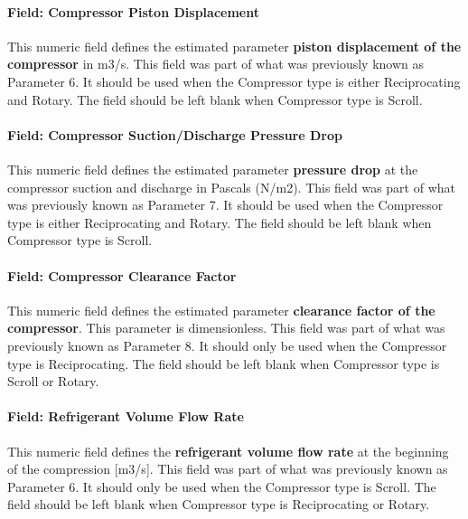 \paragraph{Field: Compressor Piston Displacement}\label{field-compressor-piston-displacement}

This numeric field defines the estimated parameter \textbf{piston displacement of the compressor} in m3/s. This field was part of what was previously known as Parameter 6. It should be used when the Compressor type is either Reciprocating and Rotary. The field should be left blank when Compressor type is Scroll.

\paragraph{Field: Compressor Suction/Discharge Pressure Drop}\label{field-compressor-suctiondischarge-pressure-drop}

This numeric field defines the estimated parameter \textbf{pressure drop} at the compressor suction and discharge in Pascals (N/m2). This field was part of what was previously known as Parameter 7. It should be used when the Compressor type is either Reciprocating and Rotary. The field should be left blank when Compressor type is Scroll.

\paragraph{Field: Compressor Clearance Factor}\label{field-compressor-clearance-factor}

This numeric field defines the estimated parameter \textbf{clearance factor of the compressor}. This parameter is dimensionless. This field was part of what was previously known as Parameter 8. It should only be used when the Compressor type is Reciprocating. The field should be left blank when Compressor type is Scroll or Rotary.

\paragraph{Field: Refrigerant Volume Flow Rate}\label{field-refrigerant-volume-flow-rate}

This numeric field defines the \textbf{refrigerant volume flow rate} at the beginning of the compression {[}m3/s{]}. This field was part of what was previously known as Parameter 6. It should only be used when the Compressor type is Scroll. The field should be left blank when Compressor type is Reciprocating or Rotary.

